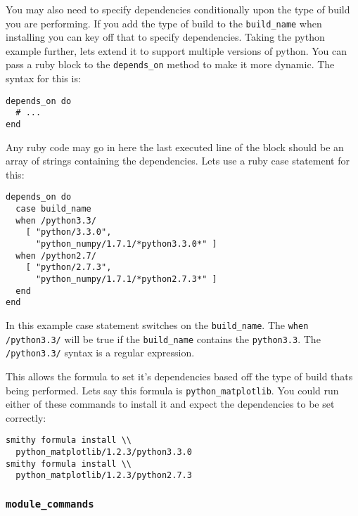 \documentclass{acm_proc_article-sp}
\begin{document}
You may also need to specify dependencies conditionally upon the type of build
you are performing. If you add the type of build to the \texttt{build\_name}
when installing you can key off that to specify dependencies. Taking the python
example further, lets extend it to support multiple versions of python. You can
pass a ruby block to the \texttt{depends\_on} method to make it more dynamic.
The syntax for this is:

\begin{quoting}
\begin{verbatim}
depends_on do
  # ...
end
\end{verbatim}
\end{quoting}

Any ruby code may go in here the last executed line of the block should be an
array of strings containing the dependencies. Lets use a ruby case statement
for this:

\begin{quoting}
\begin{verbatim}
depends_on do
  case build_name
  when /python3.3/
    [ "python/3.3.0",
      "python_numpy/1.7.1/*python3.3.0*" ]
  when /python2.7/
    [ "python/2.7.3",
      "python_numpy/1.7.1/*python2.7.3*" ]
  end
end
\end{verbatim}
\end{quoting}

In this example case statement switches on the \texttt{build\_name}. The
\texttt{when /python3.3/} will be true if the \texttt{build\_name} contains the
\texttt{python3.3}. The
\texttt{/python3.3/} syntax is a regular expression.

This allows the formula to set it's dependencies based off the type of build
thats being performed. Lets say this formula is \texttt{python\_matplotlib}. You could
run either of these commands to install it and expect the dependencies to be set
correctly:

\begin{quoting}
\begin{verbatim}
smithy formula install \\
  python_matplotlib/1.2.3/python3.3.0
smithy formula install \\
  python_matplotlib/1.2.3/python2.7.3
\end{verbatim}
\end{quoting}

\subsubsection{\texttt{module\_commands}}
\end{document}
